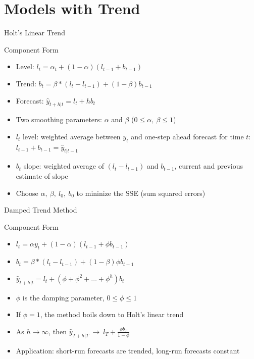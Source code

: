 \documentclass{beamer}
\begin{document}


\section{Models with Trend}

\begin{frame}{Holt's Linear Trend}

  \begin{block}{Component Form}
    \begin{itemize}
    \item Level: $l_t = \alpha_t + (1-\alpha)(l_{t-1}+ b_{t-1})$
    \item Trend: $b_t = \beta*(l_t - l_{t-1}) + (1-\beta)b_{t-1}$
    \item Forecast: $\hat{y}_{t+h|t}=  l_t + hb_t$
    \end{itemize}
  \end{block}

  \begin{itemize}
  \item Two smoothing parameters: $\alpha$ and $\beta$ ($0 \leq \alpha, \ \beta \leq 1$)
  \item $l_t$ level: weighted average between $y_t$ and one-step ahead forecast for time $t$: $l_{t-1} + b_{t-1} = \hat{y}_{t|t-1}$
  \item $b_t$ slope: weighted average of $(l_t - l_{t-1})$ and $b_{t-1}$, current and previous estimate of slope
  \item Choose $\alpha, \ \beta, \ l_0, \ b_0$ to mininize the SSE (sum squared errors)
  \end{itemize}
\end{frame}




\begin{frame}{Damped Trend Method}

  \begin{block}{Component Form}
    \begin{itemize}
    \item $l_t = \alpha y_t + (1-\alpha)(l_{t-1} + \phi b_{t-1})$
    \item $b_t = \beta*(l_t - l_{t-1}) + (1-\beta)\phi b_{t-1}$
    \item $\hat{y}_{t+h|t} = l_t + (\phi + \phi^2 + \dots + \phi^h)b_t$
    \end{itemize}
  \end{block}

  \begin{itemize}
  \item $\phi$ is the damping parameter, $0 \leq \phi \leq 1$
  \item If $\phi=1$, the method boils down to Holt's linear trend
  \item As $h \to \infty$, then $\hat{y}_{T+h|T} \ \to \ l_T + \frac{\phi b_T}{1-\phi}$
  \item Application: short-run forecasts are trended, long-run forecasts constant
  \end{itemize}
  
  
\end{frame}
\end{document}
